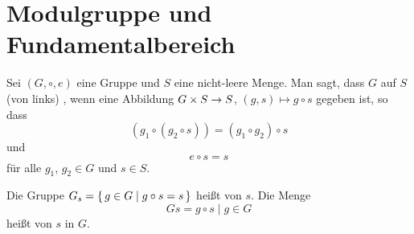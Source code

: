 \section{Modulgruppe und Fundamentalbereich}

\begin{defi}
Sei $(G, \circ, e)$ eine Gruppe und $S$ eine nicht-leere Menge. Man sagt, dass $G$ auf $S$ (von links) , wenn eine Abbildung $G \times S \rightarrow S$, $(g, s) \mapsto g \circ s$ gegeben ist, so dass
\[
	(g_1 \circ (g_2 \circ s)) = (g_1 \circ g_2) \circ s
\]
und
\[
	e \circ s = s
\]
für alle $g_1$, $g_2 \in G$ und $s \in S$.

Die Gruppe $G_s = \left\{\,g \in G \mid g \circ s = s\,\right\}$ heißt  von $s$.
Die Menge
\[
	Gs = {g \circ s \mid g\in G}
\]
heißt  von $s$ in $G$.
\end{defi}